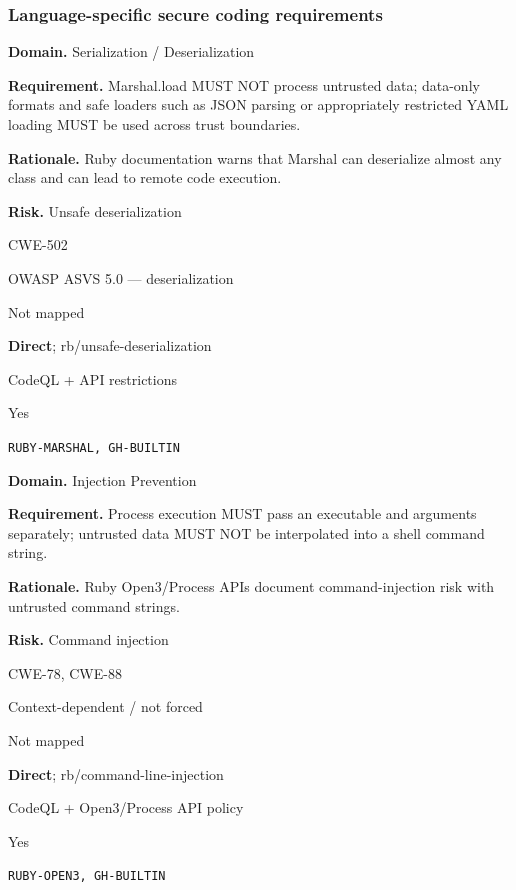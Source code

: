 \documentclass[10pt,letterpaper]{article}
\newcommand{\prioritybadge}[2]{\tcbox[on line,boxrule=0pt,arc=1.2mm,boxsep=0.7mm,left=1mm,right=1mm,top=0.4mm,bottom=0.4mm,colback=#2!12,coltext=#2]{\scriptsize\bfseries #1}}
\begin{document}
\subsubsection*{Language-specific secure coding requirements}

\begin{rulebox}[title={\texttt{SCS-RUBY-DESER-001} \hfill \prioritybadge{Critical Control}{Critical}}]
\textbf{Domain.} Serialization / Deserialization

\textbf{Requirement.} Marshal.load MUST NOT process untrusted data; data-only formats and safe loaders such as JSON parsing or appropriately restricted YAML loading MUST be used across trust boundaries.

\textbf{Rationale.} Ruby documentation warns that Marshal can deserialize almost any class and can lead to remote code execution.

\textbf{Risk.} Unsafe deserialization

\begin{description}[leftmargin=2.65cm,labelwidth=2.3cm,style=nextline,itemsep=1pt,topsep=3pt]
  \item[CWE] CWE-502
  \item[OWASP] OWASP ASVS 5.0 --- deserialization
  \item[CERT] Not mapped
  \item[CodeQL] \textbf{Direct}; rb/unsafe-deserialization
  \item[Enforcement] CodeQL + API restrictions
  \item[Automation] Yes
  \item[Sources] \texttt{RUBY-MARSHAL, GH-BUILTIN}
\end{description}
\end{rulebox}

\begin{rulebox}[title={\texttt{SCS-RUBY-INJ-001} \hfill \prioritybadge{Critical Control}{Critical}}]
\textbf{Domain.} Injection Prevention

\textbf{Requirement.} Process execution MUST pass an executable and arguments separately; untrusted data MUST NOT be interpolated into a shell command string.

\textbf{Rationale.} Ruby Open3/Process APIs document command-injection risk with untrusted command strings.

\textbf{Risk.} Command injection

\begin{description}[leftmargin=2.65cm,labelwidth=2.3cm,style=nextline,itemsep=1pt,topsep=3pt]
  \item[CWE] CWE-78, CWE-88
  \item[OWASP] Context-dependent / not forced
  \item[CERT] Not mapped
  \item[CodeQL] \textbf{Direct}; rb/command-line-injection
  \item[Enforcement] CodeQL + Open3/Process API policy
  \item[Automation] Yes
  \item[Sources] \texttt{RUBY-OPEN3, GH-BUILTIN}
\end{description}
\end{rulebox}
\end{document}

